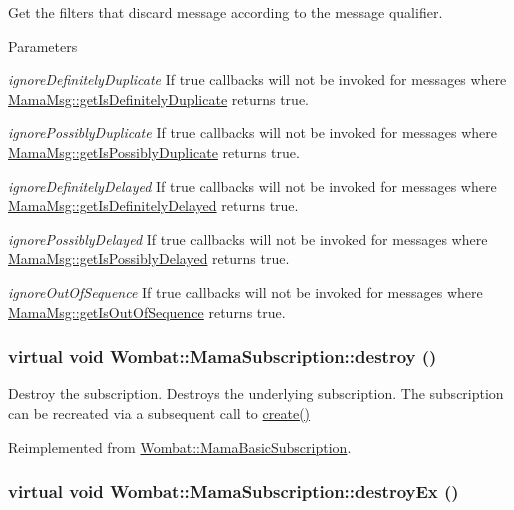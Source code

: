 Get the filters that discard message according to the message qualifier. 
\begin{DoxyParams}{Parameters}
\item[{\em ignoreDefinitelyDuplicate}]If true callbacks will not be invoked for messages where \hyperlink{classWombat_1_1MamaMsg_aa29712e33dec9598f58d8b47d954a688}{MamaMsg::getIsDefinitelyDuplicate} returns true.\item[{\em ignorePossiblyDuplicate}]If true callbacks will not be invoked for messages where \hyperlink{classWombat_1_1MamaMsg_a3ac6ff5481827b2be803a43f1e5675e6}{MamaMsg::getIsPossiblyDuplicate} returns true.\item[{\em ignoreDefinitelyDelayed}]If true callbacks will not be invoked for messages where \hyperlink{classWombat_1_1MamaMsg_a8fe32c62e0c88639c9e022337d4c7228}{MamaMsg::getIsDefinitelyDelayed} returns true.\item[{\em ignorePossiblyDelayed}]If true callbacks will not be invoked for messages where \hyperlink{classWombat_1_1MamaMsg_ad404a729cc7d7c213fd52e0235689d9e}{MamaMsg::getIsPossiblyDelayed} returns true.\item[{\em ignoreOutOfSequence}]If true callbacks will not be invoked for messages where \hyperlink{classWombat_1_1MamaMsg_a2b01886c287dd83c9b9a9aa20a9d9267}{MamaMsg::getIsOutOfSequence} returns true. \end{DoxyParams}
\hypertarget{classWombat_1_1MamaSubscription_a331eee861f0185e564bcceac3aedde24}{
\subsubsection[{destroy}]{\setlength{\rightskip}{0pt plus 5cm}virtual void Wombat::MamaSubscription::destroy ()}}
\label{classWombat_1_1MamaSubscription_a331eee861f0185e564bcceac3aedde24}


Destroy the subscription. Destroys the underlying subscription. The subscription can be recreated via a subsequent call to \hyperlink{classWombat_1_1MamaSubscription_a2ac46ac833f5af07a09457c4eb778196}{create()} 

Reimplemented from \hyperlink{classWombat_1_1MamaBasicSubscription_a296c25c10faa885e408e064a626ce3dd}{Wombat::MamaBasicSubscription}.\hypertarget{classWombat_1_1MamaSubscription_a2607ec39a0426074664326920a5733f9}{
\subsubsection[{destroyEx}]{\setlength{\rightskip}{0pt plus 5cm}virtual void Wombat::MamaSubscription::destroyEx ()}}
\label{classWombat_1_1MamaSubscription_a2607ec39a0426074664326920a5733f9}


